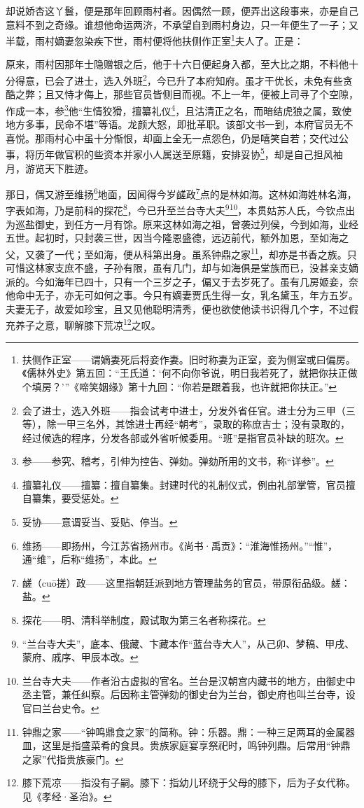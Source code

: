 \par 却说娇杏这丫鬟，便是那年回顾雨村者。因偶然一顾，便弄出这段事来，亦是自己意料不到之奇缘。谁想他命运两济，不承望自到雨村身边，只一年便生了一子；又半载，雨村嫡妻忽染疾下世，雨村便将他扶侧作正室\footnote{扶侧作正室——谓嫡妻死后将妾作妻。旧时称妻为正室，妾为侧室或曰偏房。《儒林外史》第五回：“王氏道：‘何不向你爷说，明日我若死了，就把你扶正做个填房？’”《啼笑姻缘》第十九回：“你若是跟着我，也许就把你扶正。”}夫人了。正是：
\par 原来，雨村因那年士隐赠银之后，他于十六日便起身入都，至大比之期，不料他十分得意，已会了进士，选入外班\footnote{会了进士，选入外班——指会试考中进士，分发外省任官。进士分为三甲（三等），除一甲三名外，其馀进士再经“朝考”，录取的称庶吉士；没有录取的，经过候选的程序，分发各部或外省听候委用。“班”是指官员补缺的班次。}，今已升了本府知府。虽才干优长，未免有些贪酷之弊；且又恃才侮上，那些官员皆侧目而视。不上一年，便被上司寻了个空隙，作成一本，参\footnote{参——参究、稽考，引伸为控告、弹劾。弹劾所用的文书，称“详参”。}他“生情狡猾，擅纂礼仪\footnote{擅纂礼仪——擅纂：擅自纂集。封建时代的礼制仪式，例由礼部掌管，官员擅自纂集，要受惩处。}，且沽清正之名，而暗结虎狼之属，致使地方多事，民命不堪”等语。龙颜大怒，即批革职。该部文书一到，本府官员无不喜悦。那雨村心中虽十分惭恨，却面上全无一点怨色，仍是嘻笑自若；交代过公事，将历年做官积的些资本并家小人属送至原籍，安排妥协\footnote{妥协——意谓妥当、妥贴、停当。}，却是自己担风袖月，游览天下胜迹。
\par 那日，偶又游至维扬\footnote{维扬——即扬州，今江苏省扬州市。《尚书·禹贡》：“淮海惟扬州。”“惟”，通“维”，后称“维扬”，本此。}地面，因闻得今岁鹾政\footnote{鹾（cuō搓）政——这里指朝廷派到地方管理盐务的官员，带原衔品级。鹾：盐。}点的是林如海。这林如海姓林名海，字表如海，乃是前科的探花\footnote{探花——明、清科举制度，殿试取为第三名者称探花。}，今已升至兰台寺大夫\footnote{“兰台寺大夫”，底本、俄藏、卞藏本作“蓝台寺大人”，从己卯、梦稿、甲戌、蒙府、戚序、甲辰本改。}\footnote{兰台寺大夫——作者沿古虚拟的官名。兰台是汉朝宫内藏书的地方，由御史中丞主管，兼任纠察。后因称主管弹劾的御史台为兰台，御史府也叫兰台寺，设官曰兰台史令。}，本贯姑苏人氏，今钦点出为巡盐御史，到任方一月有馀。原来这林如海之祖，曾袭过列侯，今到如海，业经五世。起初时，只封袭三世，因当今隆恩盛德，远迈前代，额外加恩，至如海之父，又袭了一代；至如海，便从科第出身。虽系钟鼎之家\footnote{钟鼎之家——“钟鸣鼎食之家”的简称。钟：乐器。鼎：一种三足两耳的金属器皿，这里是指盛菜肴的食具。贵族家庭宴享祭祀时，鸣钟列鼎。后常用“钟鼎之家”代指贵族豪门。}，却亦是书香之族。只可惜这林家支庶不盛，子孙有限，虽有几门，却与如海俱是堂族而已，没甚亲支嫡派的。今如海年已四十，只有一个三岁之子，偏又于去岁死了。虽有几房姬妾，奈他命中无子，亦无可如何之事。今只有嫡妻贾氏生得一女，乳名黛玉，年方五岁。夫妻无子，故爱如珍宝，且又见他聪明清秀，便也欲使他读书识得几个字，不过假充养子之意，聊解膝下荒凉\footnote{膝下荒凉——指没有子嗣。膝下：指幼儿环绕于父母的膝下，后为子女代称。见《孝经·圣治》。}之叹。
